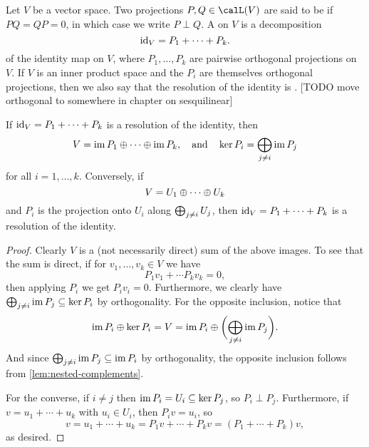 Let $V$ be a vector space. Two projections $P,Q \in \lin(V)$ are said to be  if $PQ = QP = 0$, in which case we write $P \perp Q$. A  on $V$ is a decomposition
%
\begin{equation*}
    \operatorname{id}_V
        = P_1 + \cdots + P_k.
\end{equation*}
%
of the identity map on $V$, where $P_1, \ldots, P_k$ are pairwise orthogonal projections on $V$. If $V$ is an inner product space and the $P_i$ are themselves orthogonal projections, then we also say that the resolution of the identity is . [TODO move orthogonal to somewhere in chapter on sesquilinear]

\begin{proposition}
    \label{prop:resolution-of-the-identity-characterisation}
    If $\operatorname{id}_V = P_1 + \cdots + P_k$ is a resolution of the identity, then
    \begin{equation*}
        V
            = \operatorname{im} P_1 \oplus \cdots \oplus \operatorname{im} P_k,
        \quad \text{and} \quad
        \ker P_i
            = \bigoplus_{j \neq i} \operatorname{im} P_j
    \end{equation*}
    for all $i = 1, \ldots, k$. Conversely, if
    \begin{equation*}
        V
            = U_1 \oplus \cdots \oplus U_k
    \end{equation*}
    and $P_i$ is the projection onto $U_i$ along $\bigoplus_{j \neq i} U_j$, then $\operatorname{id}_V = P_1 + \cdots + P_k$ is a resolution of the identity.
\end{proposition}

\begin{proof}
    Clearly $V$ is a (not necessarily direct) sum of the above images. To see that the sum is direct, if for $v_1, \ldots, v_k \in V$ we have
    \begin{equation*}
        P_1 v_1 + \cdots P_k v_k = 0,
    \end{equation*}
    then applying $P_i$ we get $P_i v_i = 0$. Furthermore, we clearly have $\bigoplus_{j \neq i} \operatorname{im} P_j \subseteq \ker P_i$ by orthogonality. For the opposite inclusion, notice that
    \begin{equation*}
        \operatorname{im} P_i \oplus \ker P_i
            = V
            = \operatorname{im} P_i \oplus \biggl( \bigoplus_{j \neq i} \operatorname{im} P_j \biggr).
    \end{equation*}
    And since $\bigoplus_{j \neq i} \operatorname{im} P_j \subseteq \operatorname{im} P_i$ by orthogonality, the opposite inclusion follows from \cref{lem:nested-complements}.

    For the converse, if $i \neq j$ then $\operatorname{im} P_i = U_i \subseteq \ker P_j$, so $P_i \perp P_j$. Furthermore, if $v = u_1 + \cdots + u_k$ with $u_i \in U_i$, then $P_i v = u_i$, so
    \begin{equation*}
        v
            = u_1 + \cdots + u_k
            = P_1 v + \cdots + P_k v
            = (P_1 + \cdots + P_k) v,
    \end{equation*}
    as desired.
\end{proof}